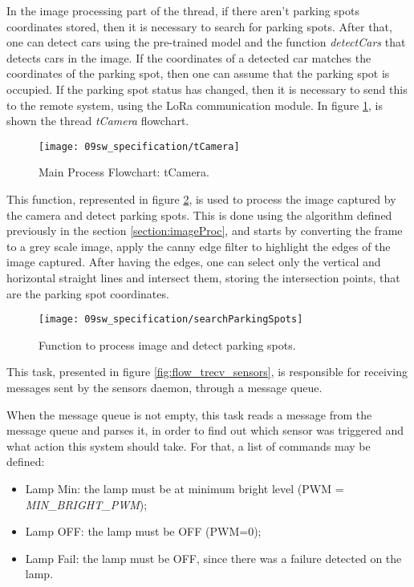 In the image processing part of the thread, if there aren't parking spots coordinates stored, then it is necessary to search for parking spots. After that, one can detect cars using the pre-trained model and the function \textit{detectCars} that detects cars in the image. If the coordinates of a detected car matches the coordinates of the parking spot, then one can assume that the parking spot is occupied. If the parking spot status has changed, then it is necessary to send this to the remote system, using the LoRa communication module. In figure \ref{fig:flow_tcamera}, is shown the thread \textit{tCamera} flowchart.

\begin{figure}[H]
	\centering			
	\texttt{[image: 09sw\_specification/tCamera]}
	\caption{Main Process Flowchart: tCamera.}
	\label{fig:flow_tcamera}
\end{figure}


This function, represented in figure \ref{fig:search}, is used to process the image captured by the camera and detect parking spots. This is done using the algorithm defined previously in the section \ref{section:imageProc}, and starts by converting the frame to a grey scale image, apply the canny edge filter to highlight the edges of the image captured. After having the edges, one can select only the vertical and horizontal straight lines and intersect them, storing the intersection points, that are the parking spot coordinates.

\begin{figure}[H]
	\centering			
	\texttt{[image: 09sw\_specification/searchParkingSpots]}
	\caption{Function to process image and detect parking spots.}
	\label{fig:search}
\end{figure}



This task, presented in figure \ref{fig:flow_trecv_sensors}, is responsible for receiving messages sent by the sensors daemon, through a message queue.

When the message queue is not empty, this task reads a message from the message queue and parses it, in order to find out which sensor was triggered and what action this system should take. For that, a list of commands may be defined:
\begin{itemize}
	\item Lamp Min: the lamp must be at minimum bright level (PWM = \textit{MIN\_BRIGHT\_PWM});
	\item Lamp OFF: the lamp must be OFF (PWM=0);
	\item Lamp Fail: the lamp must be OFF, since there was a failure detected on the lamp.
\end{itemize}

